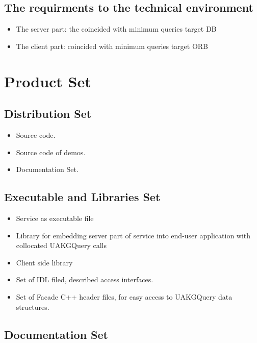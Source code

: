 \documentclass[12pt]{article}
\begin{document}
\subsection{The requirments to the technical environment }

 \begin{itemize}
   \item The server part: the coincided with minimum queries target DB 
\item The client part: coincided with minimum queries target ORB 
\end{itemize}



\section{ Product Set }

\subsection{ Distribution Set }

   \begin{itemize}
     \item Source code.
     \item Source code of demos.
     \item Documentation Set.
   \end{itemize}

\subsection{ Executable and Libraries Set }

   \begin{itemize}
    \item Service as executable file
    \item Library for embedding server part of service into end-user application with collocated UAKGQuery calls
    \item Client side library
    \item Set of IDL filed, described access interfaces.
    \item Set of Facade C++ header files, for easy access to UAKGQuery data structures.
   \end{itemize} 
  
\subsection{ Documentation Set }
\end{document}
